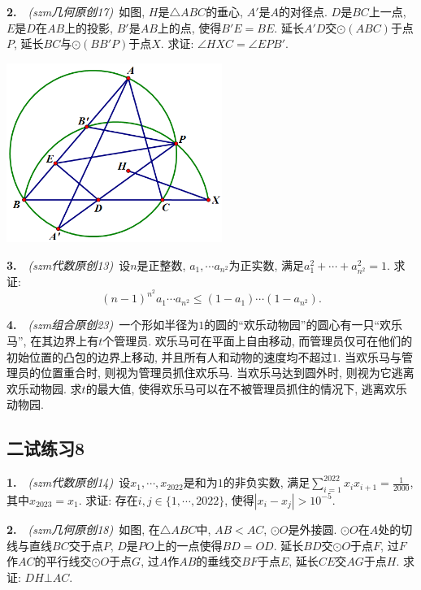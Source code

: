\vspace{21em}

\textbf{2.}~~\textit{(szm几何原创17)}~如图, $H$是$\triangle ABC$的垂心, $A'$是$A$的对径点. $D$是$BC$上一点, $E$是$D$在$AB$上的投影, $B'$是$AB$上的点, 使得$B'E=BE$. 延长$A'D$交$\odot (ABC)$于点$P$, 延长$BC$与$\odot (BB'P)$于点$X$. 求证: $\angle HXC = \angle EPB'$. 

\vspace{2em}
\includegraphics[width=7cm]{attachment/g17.png}

\newpage

\textbf{3.}~~\textit{(szm代数原创13)}~设$n$是正整数, $a_1,\cdots a_{n^2}$为正实数, 满足$a_1^2 + \cdots +a_{n^2}^2 =1$. 求证: $$(n-1)^{n^2}a_1\cdots a_{n^2} \leq (1-a_1)\cdots (1-a_{n^2}).$$

\vspace{23em}

\textbf{4.}~~\textit{(szm组合原创23)}~一个形如半径为$1$的圆的“欢乐动物园”的圆心有一只“欢乐马”, 在其边界上有$t$个管理员. 欢乐马可在平面上自由移动, 而管理员仅可在他们的初始位置的凸包的边界上移动, 并且所有人和动物的速度均不超过$1$. 当欢乐马与管理员的位置重合时, 则视为管理员抓住欢乐马. 当欢乐马达到圆外时, 则视为它逃离欢乐动物园. 求$t$的最大值, 使得欢乐马可以在不被管理员抓住的情况下, 逃离欢乐动物园. 




\newpage
\subsection*{二试练习8}

\textbf{1.}~~\textit{(szm代数原创14)}~设$x_1,\cdots ,x_{2022}$是和为$1$的非负实数, 满足$\sum_{i=1}^{2022}x_ix_{i+1}=\frac{1}{2000}$, 其中$x_{2023}=x_1$. 求证: 存在$i,j \in \{ 1,\cdots ,2022 \}$, 使得$|x_i-x_j|>10^{-5}$. 

\vspace{24em}

\textbf{2.}~~\textit{(szm几何原创18)}~如图, 在$\triangle ABC$中, $AB < AC$, $\odot O$是外接圆. $\odot O$在$A$处的切线与直线$BC$交于点$P$, $D$是$PO$上的一点使得$BD=OD$. 延长$BD$交$\odot O$于点$F$, 过$F$作$AC$的平行线交$\odot O$于点$G$, 过$A$作$AB$的垂线交$BF$于点$E$, 延长$CE$交$AG$于点$H$. 求证: $DH \bot AC$. 


